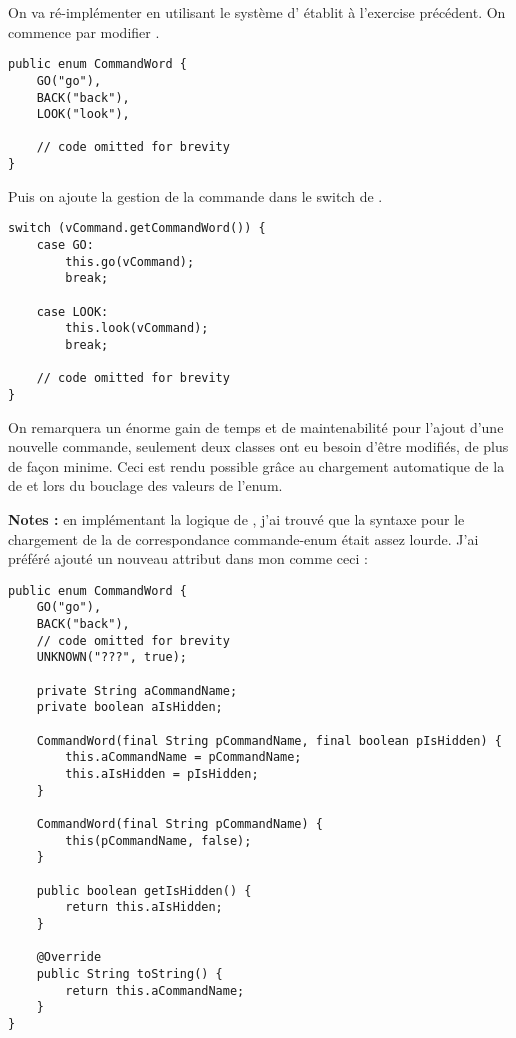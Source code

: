 \begin{exercise}[subtitle=enum/look]

On va ré-implémenter  en utilisant le système d' établit à l'exercise précédent. On commence par modifier .

\begin{verbatim}
public enum CommandWord {
    GO("go"),
    BACK("back"),
    LOOK("look"),
    
    // code omitted for brevity
}
\end{verbatim}

Puis on ajoute la gestion de la commande dans le switch de .

\begin{verbatim}
switch (vCommand.getCommandWord()) {
    case GO:
        this.go(vCommand);
        break;

    case LOOK:
        this.look(vCommand);
        break;
        
    // code omitted for brevity
}
\end{verbatim}

On remarquera un énorme gain de temps et de maintenabilité pour l'ajout d'une nouvelle commande, seulement deux classes ont eu besoin d'être modifiés, de plus de façon minime. Ceci est rendu possible grâce au chargement automatique de la  de  et lors du bouclage des valeurs de l'enum.

\textbf{Notes :} en implémentant la logique de , j'ai trouvé que la syntaxe pour le chargement de la  de correspondance commande-enum était assez lourde. J'ai préféré ajouté un nouveau attribut dans mon  comme ceci :

\begin{verbatim}
public enum CommandWord {
    GO("go"),
    BACK("back"),
    // code omitted for brevity
    UNKNOWN("???", true);

    private String aCommandName;
    private boolean aIsHidden;

    CommandWord(final String pCommandName, final boolean pIsHidden) {
        this.aCommandName = pCommandName;
        this.aIsHidden = pIsHidden;
    }

    CommandWord(final String pCommandName) {
        this(pCommandName, false);
    }

    public boolean getIsHidden() {
        return this.aIsHidden;
    }

    @Override
    public String toString() {
        return this.aCommandName;
    }
}


\end{verbatim}
\end{exercise}
